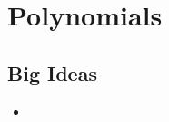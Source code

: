 \chapter{Polynomials}
\label{chap:P}

\section{Big Ideas}
\label{sec:P Big Ideas}
\begin{itemize}
  \item 
\end{itemize}
